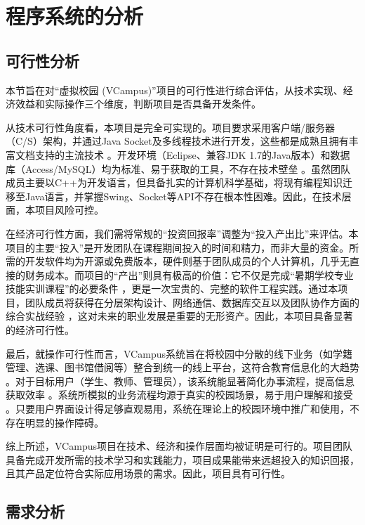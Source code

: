 \ifx\maindoc\undefined
\fi

\section{程序系统的分析}

\subsection{可行性分析}

本节旨在对“虚拟校园 (VCampus)”项目的可行性进行综合评估，从技术实现、经济效益和实际操作三个维度，判断项目是否具备开发条件。

从技术可行性角度看，本项目是完全可实现的。项目要求采用客户端/服务器（C/S）架构，并通过Java Socket及多线程技术进行开发，这些都是成熟且拥有丰富文档支持的主流技术 。开发环境（Eclipse、兼容JDK 1.7的Java版本）和数据库（Access/MySQL）均为标准、易于获取的工具，不存在技术壁垒 。虽然团队成员主要以C++为开发语言，但具备扎实的计算机科学基础，将现有编程知识迁移至Java语言，并掌握Swing、Socket等API不存在根本性困难。因此，在技术层面，本项目风险可控。

在经济可行性方面，我们需将常规的“投资回报率”调整为“投入产出比”来评估。本项目的主要“投入”是开发团队在课程期间投入的时间和精力，而非大量的资金。所需的开发软件均为开源或免费版本，硬件则基于团队成员的个人计算机，几乎无直接的财务成本。而项目的“产出”则具有极高的价值：它不仅是完成“暑期学校专业技能实训课程”的必要条件 ，更是一次宝贵的、完整的软件工程实践。通过本项目，团队成员将获得在分层架构设计、网络通信、数据库交互以及团队协作方面的综合实战经验 ，这对未来的职业发展是重要的无形资产。因此，本项目具备显著的经济可行性。

最后，就操作可行性而言，VCampus系统旨在将校园中分散的线下业务（如学籍管理、选课、图书馆借阅等）整合到统一的线上平台，这符合教育信息化的大趋势 。对于目标用户（学生、教师、管理员），该系统能显著简化办事流程，提高信息获取效率 。系统所模拟的业务流程均源于真实的校园场景，易于用户理解和接受 。只要用户界面设计得足够直观易用，系统在理论上的校园环境中推广和使用，不存在明显的操作障碍。

综上所述，VCampus项目在技术、经济和操作层面均被证明是可行的。项目团队具备完成开发所需的技术学习和实践能力，项目成果能带来远超投入的知识回报，且其产品定位符合实际应用场景的需求。因此，项目具有可行性。

\subsection{需求分析}

